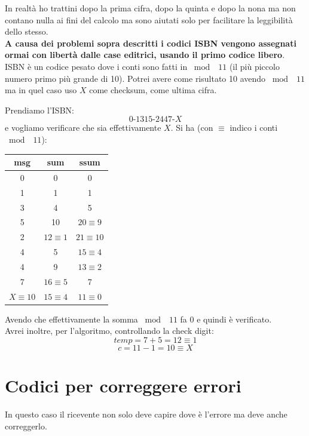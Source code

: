 \documentclass[a4paper,12pt, oneside]{book}
\begin{document}
In realtà ho trattini dopo la prima cifra, dopo la quinta e dopo la nona ma non
contano nulla ai fini del calcolo ma sono aiutati solo per facilitare la
leggibilità dello stesso.\\
\textbf{A causa dei problemi sopra descritti i codici ISBN vengono assegnati
  ormai con libertà dalle case editrici, usando il primo codice libero}.\\
ISBN è un codice pesato dove i conti sono
fatti in $\bmod\,\,\,11$ (il più piccolo numero primo più grande di 10). Potrei
avere come risultato 10 avendo $\bmod\,\,\,11$ ma in quel caso uso $X$ come
checksum, come ultima cifra.
\begin{esempio}
  Prendiamo l'ISBN:
  \[0\mbox{-}1315\mbox{-}2447\mbox{-} X\]
  e vogliamo verificare che sia effettivamente $X$. Si ha (con $\equiv$ indico i
  conti $\bmod\,\,\,11$):
  \begin{table}[H]
    \centering
    \begin{tabular}{|c|c|c|}
      \hline
      msg & sum & ssum \\
      \hline
      0 & 0 & 0\\
      1 & 1 & 1\\
      3  & 4 & 5\\
      5 & 10 & $20\equiv 9$\\
      2& $12\equiv 1$ & $21\equiv 10$\\
      4 & 5 & $15\equiv 4$\\
      4 & 9 & $13\equiv 2$\\
      7 & $16\equiv 5$ & 7\\
      \hline
      $X\equiv 10$ & $15\equiv 4$ & $11\equiv 0$\\
      \hline
    \end{tabular}
  \end{table}
  Avendo che effettivamente la somma $\bmod\,\,\,11$ fa 0 e quindi è
  verificato.\\ 
  Avrei inoltre, per l'algoritmo, controllando la check digit:
  \[temp = 7+5=12\equiv 1\]
  \[c=11-1=10\equiv X\]
\end{esempio}
\section{Codici per correggere errori}
In questo caso il ricevente non solo deve capire dove è l'errore ma deve anche
correggerlo. 
\end{document}
